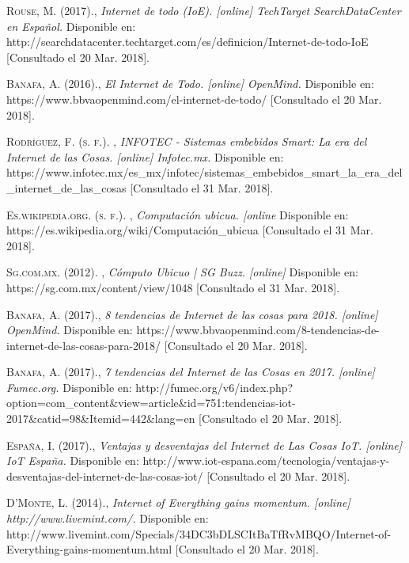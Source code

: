  \textsc{Rouse, M. (2017).}, 
\textit{ Internet de todo (IoE). [online] TechTarget SearchDataCenter en Español. }
Disponible en: http://searchdatacenter.techtarget.com/es/definicion/Internet-de-todo-IoE [Consultado el 20 Mar. 2018].

 \textsc{Banafa, A. (2016).}, 
\textit{El Internet de Todo. [online] OpenMind.}
Disponible en: https://www.bbvaopenmind.com/el-internet-de-todo/ [Consultado el 20 Mar. 2018].

 \textsc{ Rodríguez, F. (s. f.). }, 
\textit{ INFOTEC - Sistemas embebidos Smart: La era del Internet de las Cosas. [online] Infotec.mx.  }
Disponible en: https://www.infotec.mx/es\_mx/infotec/sistemas\_embebidos\_smart\_la\_era\_del\_internet\_de\_las\_cosas  [Consultado el 31 Mar. 2018].

 \textsc{ Es.wikipedia.org. (s. f.). }, 
\textit{ Computación ubicua. [online }
Disponible en: https://es.wikipedia.org/wiki/Computación\_ubicua  [Consultado el 31 Mar. 2018].

 \textsc{ Sg.com.mx. (2012). }, 
\textit{ Cómputo Ubicuo | SG Buzz. [online] }
Disponible en: https://sg.com.mx/content/view/1048  [Consultado el 31 Mar. 2018].

 \textsc{Banafa, A. (2017).}, 
\textit{8 tendencias de Internet de las cosas para 2018. [online] OpenMind.}
Disponible en: https://www.bbvaopenmind.com/8-tendencias-de-internet-de-las-cosas-para-2018/ [Consultado el 20 Mar. 2018].

 \textsc{Banafa, A. (2017).}, 
\textit{7 tendencias del Internet de las Cosas en 2017. [online]  Fumec.org.}
Disponible en: http://fumec.org/v6/index.php?option=com\_content\&view=article\&id=751:tendencias-iot-2017\&catid=98\&Itemid=442\&lang=en [Consultado el 20 Mar. 2018].

 \textsc{España, I. (2017).}, 
\textit{ Ventajas y desventajas del Internet de Las Cosas IoT. [online] IoT España.}
Disponible en: http://www.iot-espana.com/tecnologia/ventajas-y-desventajas-del-internet-de-las-cosas-iot/ [Consultado el 20 Mar. 2018].

 \textsc{D’Monte, L. (2014).}, 
\textit{Internet of Everything gains momentum. [online] http://www.livemint.com/. }
Disponible en: http://www.livemint.com/Specials/34DC3bDLSCItBaTfRvMBQO/Internet-of-Everything-gains-momentum.html [Consultado el 20 Mar. 2018].


